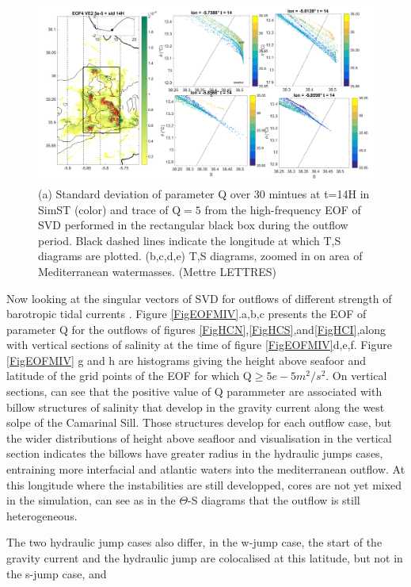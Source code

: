 \begin{figure}[!h]
 \includegraphics[width=\textwidth]{./GBR3D/TS_coupes_14H_VE2o.png}
 \caption {(a) Standard deviation of parameter Q over 30 mintues at t=14H in SimST (color) and trace of Q$=5$ from the high-frequency EOF of SVD performed in the rectangular black box during the outflow period. Black dashed lines indicate the longitude at which T,S diagrams are plotted. (b,c,d,e) T,S diagrams, zoomed in on area of Mediterranean watermasses. (Mettre LETTRES)}
 \label{FigTSCS}
\end{figure}


Now looking at the singular vectors of SVD for outflows of different strength of barotropic tidal currents . Figure \ref{FigEOFMIV}.a,b,c presents the EOF of parameter Q for the outflows of figures \ref{FigHCN},\ref{FigHCS},and\ref{FigHCI},along with vertical sections of salinity at the time of figure \ref{FigEOFMIV}d,e,f. Figure \ref{FigEOFMIV} g and h are histograms giving the height above seafoor and latitude of the grid points of the EOF for which Q$\geq 5e-5m^2/s^2$. On vertical sections, can see that the positive value of Q parammeter are associated with billow structures of salinity that develop in the gravity current along the west solpe of the Camarinal Sill. Those structures develop for each outflow case, but the wider distributions of height above seafloor and visualisation in the vertical section indicates the billows have greater radius in the hydraulic jumps cases, entraining more interfacial and atlantic waters into the mediterranean outflow. At this longitude where the instabilities are still developped, cores are not yet mixed in the simulation, can see as in the $\Theta$-S diagrams that the outflow is still heterogeneous.

The two hydraulic jump cases also differ, in the w-jump case, the start of the gravity current and the hydraulic jump are colocalised at this latitude, but not in the s-jump case, and 

